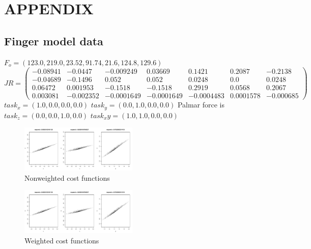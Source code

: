 \section{APPENDIX}

\subsection{Finger model data}
$F_o = (123.0, 219.0, 23.52, 91.74,	21.6, 124.8, 129.6)$\\
$
JR = 
\begin{pmatrix}
-0.08941 & -0.0447 & -0.009249 & 0.03669 & 0.1421 & 0.2087 & -0.2138 \\
-0.04689 & -0.1496 & 0.052 &0.052 & 0.0248 & 0.0 & 0.0248 \\ 
0.06472 & 0.001953 & -0.1518 &-0.1518 & 0.2919 & 0.0568 & 0.2067 \\
0.003081 & -0.002352 & -0.0001649 & -0.0001649 & -0.0004483 & 0.0001578 & -0.000685
\end{pmatrix}
$
$task_x = (1.0,0.0,0.0,0.0)$
$task_y = (0.0,1.0,0.0,0.0)$
Palmar force is $task_z = (0.0,0.0,1.0,0.0)$
$task_xy = (1.0,1.0,0.0,0.0)$

\begin{figure}[h]
\centering
\includegraphics[width=0.5\textwidth,page=1]{figs/cost_function_scatterplots.pdf}
\caption{Nonweighted cost functions}
\label{fig:unweighted_cost_functions}
\end{figure}

\begin{figure}[h]
\centering
\includegraphics[width=0.5\textwidth,page=2]{figs/cost_function_scatterplots.pdf}
\caption{Weighted cost functions}
\label{fig:weighted_cost_functions}
\end{figure}